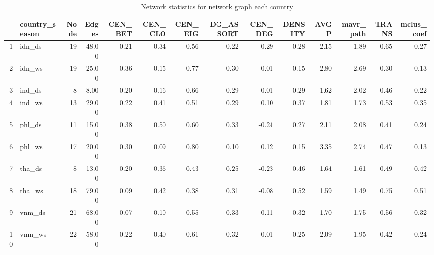 \begin{landscape}
\begin{table}
\small
\centering
\begin{tabular}{rlrrrrrrrrrrrr}
  \hline
 & country\_season & Node & Edges & CEN\_BET & CEN\_CLO & CEN\_EIG & DG\_ASSORT & CEN\_DEG & DENSITY & AVG\_P & mavr\_path & TRANS & mclus\_coef \\ 
  \hline
1 & idn\_ds &  19 & 48.00 & 0.21 & 0.34 & 0.56 & 0.22 & 0.29 & 0.28 & 2.15 & 1.89 & 0.65 & 0.27 \\ 
  2 & idn\_ws &  19 & 25.00 & 0.36 & 0.15 & 0.77 & 0.30 & 0.01 & 0.15 & 2.80 & 2.69 & 0.30 & 0.13 \\ 
  3 & ind\_ds &   8 & 8.00 & 0.20 & 0.16 & 0.66 & 0.29 & -0.01 & 0.29 & 1.62 & 2.02 & 0.46 & 0.22 \\ 
  4 & ind\_ws &  13 & 29.00 & 0.22 & 0.41 & 0.51 & 0.29 & 0.10 & 0.37 & 1.81 & 1.73 & 0.53 & 0.35 \\ 
  5 & phl\_ds &  11 & 15.00 & 0.38 & 0.50 & 0.60 & 0.33 & -0.24 & 0.27 & 2.11 & 2.08 & 0.41 & 0.24 \\ 
  6 & phl\_ws &  17 & 20.00 & 0.30 & 0.09 & 0.80 & 0.10 & 0.12 & 0.15 & 3.35 & 2.74 & 0.47 & 0.13 \\ 
  7 & tha\_ds &   8 & 13.00 & 0.20 & 0.36 & 0.43 & 0.25 & -0.23 & 0.46 & 1.64 & 1.61 & 0.49 & 0.42 \\ 
  8 & tha\_ws &  18 & 79.00 & 0.09 & 0.42 & 0.38 & 0.31 & -0.08 & 0.52 & 1.59 & 1.49 & 0.75 & 0.51 \\ 
  9 & vnm\_ds &  21 & 68.00 & 0.07 & 0.10 & 0.55 & 0.33 & 0.11 & 0.32 & 1.70 & 1.75 & 0.56 & 0.32 \\ 
  10 & vnm\_ws &  22 & 58.00 & 0.22 & 0.40 & 0.61 & 0.32 & -0.01 & 0.25 & 2.09 & 1.95 & 0.42 & 0.24 \\ 
   \hline
\end{tabular}
   \caption{Network statistics for network graph each country}
\label{table:Network_stat}
\end{table}
\end{landscape}
